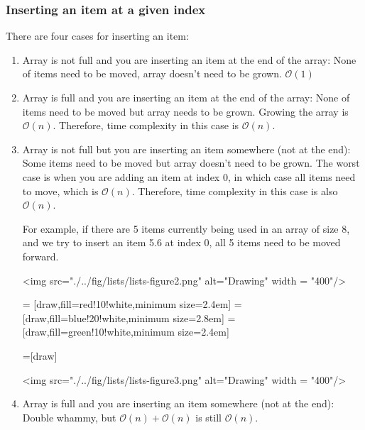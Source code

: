 \subsubsection{Inserting an item at a given index}

There are four cases for inserting an item:

\begin{enumerate}

\item Array is not full and you are inserting an item at the end of the array: None of items need to be moved, array doesn't need to be grown. $\mathcal{O}(1)$
\item Array is full and you are inserting an item at the end of the array: None of items need to be moved but array needs to be grown. Growing the array is $\mathcal{O}(n)$. Therefore, time complexity in this case is $\mathcal{O}(n)$.
\item Array is not full but you are inserting an item somewhere (not at the end): Some items need to be moved but array doesn't need to be grown. The worst case is when you are adding an item at index 0, in which case all items need to move, which is $\mathcal{O}(n)$. Therefore, time complexity in this case is also $\mathcal{O}(n)$.

For example, if there are 5 items currently being used in an array of size 8, and we try to insert an item 5.6 at index 0, all 5 items need to be moved forward.

<img src="./../fig/lists/lists-figure2.png" alt="Drawing" width = "400"/>

 = [draw,fill=red!10!white,minimum size=2.4em]
 = [draw,fill=blue!20!white,minimum size=2.8em]
 = [draw,fill=green!10!white,minimum size=2.4em]

\newcommand{\data}{{{12.5, 6.4, 8.5, 9.6, -3.4, 0, 0, 0},
					{12.5, 6.4, 8.5, 9.6, -3.4, -3.4, 0, 0},
					{12.5, 6.4, 8.5, 9.6, 9.6, -3.4, 0, 0},
					{12.5, 6.4, 8.5, 8.5, 9.6, -3.4, 0, 0},
					{12.5, 6.4, 6.4, 8.5, 9.6, -3.4, 0, 0},
					{12.5, 12.5, 6.4, 8.5, 9.6, -3.4, 0, 0},
					{6.4, 12.5, 6.4, 8.5, 9.6, -3.4, 0, 0}}}
					
=[draw] %

<img src="./../fig/lists/lists-figure3.png" alt="Drawing" width = "400"/>

\item Array is full and you are inserting an item somewhere (not at the end): Double whammy, but  $\mathcal{O}(n) + \mathcal{O}(n)$ is still $\mathcal{O}(n)$.
\end{enumerate}

